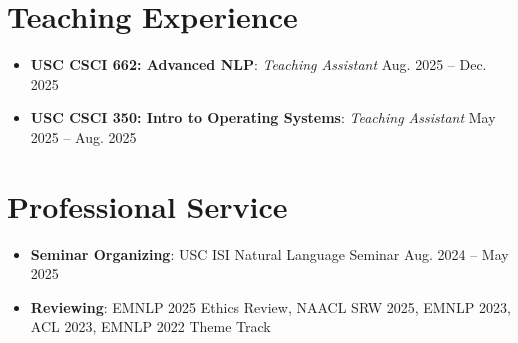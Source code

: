\documentclass[letterpaper,11pt]{article}
\newcommand{\resumeItemWithHeader}[2]{
  \item\small{
    \textbf{#1}{: #2 \vspace{-2pt}}
  }
}
\newcommand{\resumeSubHeadingListStart}{\begin{itemize}[label={}, leftmargin=*]}
\newcommand{\resumeSubHeadingListEnd}{\end{itemize}}
\begin{document}
\section{Teaching Experience}
\resumeSubHeadingListStart
    \resumeItemWithHeader{USC CSCI 662: Advanced NLP}{\textit{Teaching Assistant} \hfill Aug. 2025 -- Dec. 2025}
    \resumeItemWithHeader{USC CSCI 350: Intro to Operating Systems}{\textit{Teaching Assistant} \hfill May 2025 -- Aug. 2025}
\resumeSubHeadingListEnd


\section{Professional Service}
  \resumeSubHeadingListStart
  \resumeItemWithHeader{Seminar Organizing}{USC ISI Natural Language Seminar \hfill Aug. 2024 -- May 2025}
  \resumeItemWithHeader{Reviewing}{EMNLP 2025 Ethics Review, NAACL SRW 2025, EMNLP 2023, ACL 2023, EMNLP 2022 Theme Track}
    \resumeSubHeadingListEnd
\end{document}
